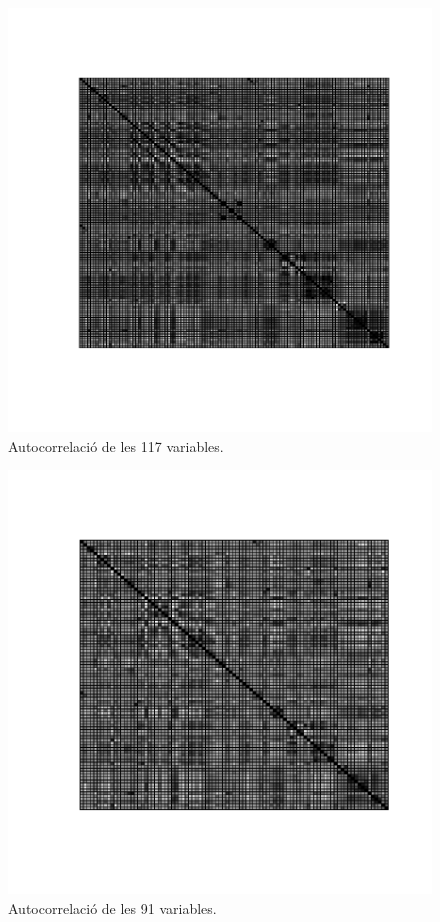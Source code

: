 \documentclass[a4paper,10pt]{article}
\begin{document}
\begin{center}
\begin{figure}
\includegraphics[width=5in]{memoria-autoc}
\caption{Autocorrelació de les 117 variables.} \label{fig:autoc}
\end{figure}
\end{center}

\begin{center}
\begin{figure}
\includegraphics[width=5in]{memoria-autoc_clean}
\caption{Autocorrelació de les 91
variables.} \label{fig:autoc_clean}
\end{figure}
\end{center}
\end{document}
